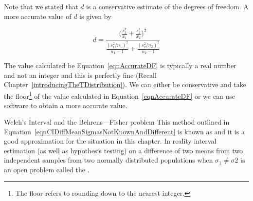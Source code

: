 Note that we stated that $d$ is a conservative estimate of the degrees of freedom.
A more accurate value of $d$ is given by 

\begin{equation}
d = \frac{ \bigg( \displaystyle \frac{ s_{1}^{2} }{ x_{1} } + \frac{ s_{2}^{2} }{ x_{2} } \bigg)^{2} }{ \displaystyle \frac{ ( s_{1}^{2} / n_{1} )^{2} }{ n_{1} - 1 }	+	\frac{ ( s_{2}^{2} / n_{2} )^{2} }{ n_{2} - 1 } }\label{eqnAccurateDF}
\end{equation}

The value calculated be Equation~\eqref{eqnAccurateDF} is typically a real number and not 
an integer and this is perfectly fine (Recall Chapter~\ref{introducingTheTDistribution}).
We can either be conservative and take the floor\footnote{The floor refers to rounding down to the nearest integer.}
 of the value calculated in Equation~\eqref{eqnAccurateDF}
or we can use software to obtain a more accurate value.





\begin{caution}
{Welch's Interval and the Behrens---Fisher problem}
{This method outlined in Equation~\ref{eqnCIDiffMeanSigmasNotKnownAndDifferent}
is known as  and it is a good approximation for the situation in this chapter.
In reality interval estimation (as well as hypothesis testing) on a difference of two means from two independent samples from two normally distributed populations when $\sigma_{1} \neq \sigma{2}$ is an open problem called the . }
\end{caution}



